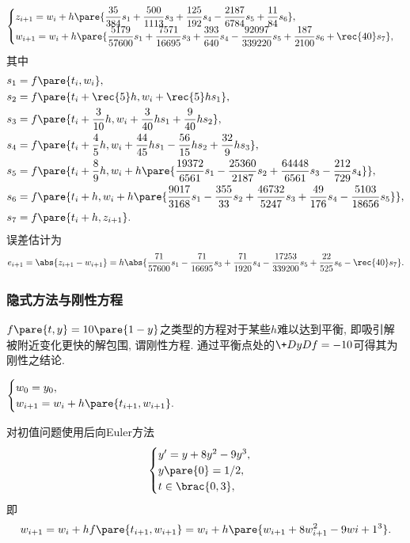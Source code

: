 \documentclass{ctexart}
\begin{document}
\begin{ex}
    \[ \begin{cases}
        \displaystyle z_{i+1} = w_i + h\pare{\frac{35}{384}s_1 + \frac{500}{1113}s_3 + \frac{125}{192}s_4 - \frac{2187}{6784}s_5 + \frac{11}{84}s_6}, \\
        \displaystyle w_{i+1} = w_i + h\pare{\frac{5179}{57600}s_1 + \frac{7571}{16695}s_3 + \frac{393}{640}s_4 - \frac{92097}{339220}s_5 + \frac{187}{2100}s_6 + \rec{40}s_7},
    \end{cases} \]
    其中
    \begin{align*}
        s_1 &= f\pare{t_i,w_i}, \\
        s_2 &= f\pare{t_i + \rec{5}h, w_i + \rec{5}hs_1}, \\
        s_3 &= f\pare{t_i + \frac{3}{10}h, w_i + \frac{3}{40}hs_1 + \frac{9}{40}hs_2}, \\
        s_4 &= f\pare{t_i + \frac{4}{5}h, w_i + \frac{44}{45}hs_1 - \frac{56}{15}hs_2 + \frac{32}{9}hs_3}, \\
        s_5 &= f\pare{t_i + \frac{8}{9}h, w_i + h\pare{\frac{19372}{6561}s_1 - \frac{25360}{2187}s_2 + \frac{64448}{6561}s_3 - \frac{212}{729}s_4}}, \\
        s_6 &= f\pare{t_i + h, w_i + h\pare{\frac{9017}{3168}s_1 - \frac{355}{33}s_2 + \frac{46732}{5247}s_3 + \frac{49}{176}s_4 - \frac{5103}{18656}s_5}}, \\
        s_7 &= f\pare{t_i + h, z_{i+1}}.
    \end{align*}
    误差估计为
    \[ e_{i+1} = \abs{z_{i+1} - w_{i+1}} = h\abs{\frac{71}{57600}s_1 - \frac{71}{16695}s_3 + \frac{71}{1920}s_4 - \frac{17253}{339200}s_5 + \frac{22}{525}s_6 - \rec{40}s_7}. \]
\end{ex}


\subsubsection{隐式方法与刚性方程} %
\label{ssub:隐式方法与刚性方程}

$f\pare{t,y} = 10\pare{1-y}$之类型的方程对于某些$h$难以达到平衡, 即吸引解被附近变化更快的解包围, 谓刚性方程. 通过平衡点处的$\displaystyle \+DyDf = -10$可得其为刚性之结论.
\begin{theorem}[后向Euler方法]%
    $\displaystyle \begin{cases}
        w_0 = y_0, \\
        w_{i+1} = w_i + h\pare{t_{i+1}, w_{i+1}}.
    \end{cases}$
\end{theorem}
\begin{ex}
    对初值问题使用后向Euler方法
    \[ \begin{cases}
        y' = y + 8y^2 - 9y^3, \\
        y\pare{0} = 1/2, \\
        t \in \brac{0,3},
    \end{cases} \]
    即
    \[ w_{i+1} = w_i + hf\pare{t_{i+1},w_{i+1}} = w_i + h\pare{w_{i+1} + 8w_{i+1}^2 - 9w{i+1}^3}. \]
\end{ex}
\end{document}
